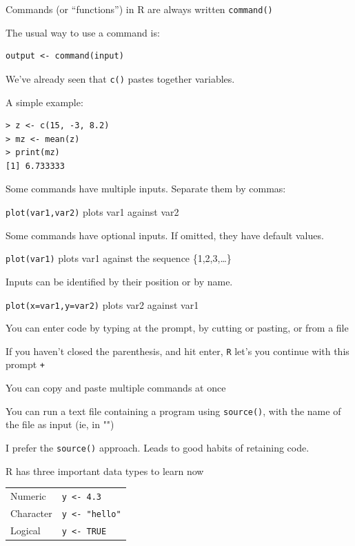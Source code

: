 \documentclass[pdflatex,landscape,titlepage]{foils}
\begin{document}
Commands (or ``functions'') in R are always written \texttt{command()}

The usual way to use a command is:

\begin{verbatim}
output <- command(input)
\end{verbatim}

We've already seen that \texttt{c()} pastes together variables.

A simple example:

\begin{verbatim}
> z <- c(15, -3, 8.2)
> mz <- mean(z)
> print(mz)
[1] 6.733333
\end{verbatim}

\bgclear

Some commands have multiple inputs.  Separate them by commas:

\texttt{plot(var1,var2)}  plots var1 against var2

Some commands have optional inputs.  If omitted, they have default values.

\texttt{plot(var1)} plots var1 against the sequence \{1,2,3,\ldots\}

Inputs can be identified by their position or by name.

\texttt{plot(x=var1,y=var2)} plots  var2 against var1


\bgclear

You can enter code by typing at the prompt, by cutting or pasting, or from a file

If you haven't closed the parenthesis, and hit enter, \texttt{R} let's you continue with this prompt \texttt{+}

You can copy and paste multiple commands at once

You can run a text file containing a program using \texttt{source()}, with the name of the file as input (ie, in "")

I prefer the \texttt{source()} approach.  Leads to good habits of retaining code.




R has three important data types to learn now

\begin{tabular}{ll}
Numeric  &  \texttt{y <- 4.3} \\
Character   &  \texttt{y <- "hello"} \\
Logical  &  \texttt{y <- TRUE}
\end{tabular}
\end{document}
